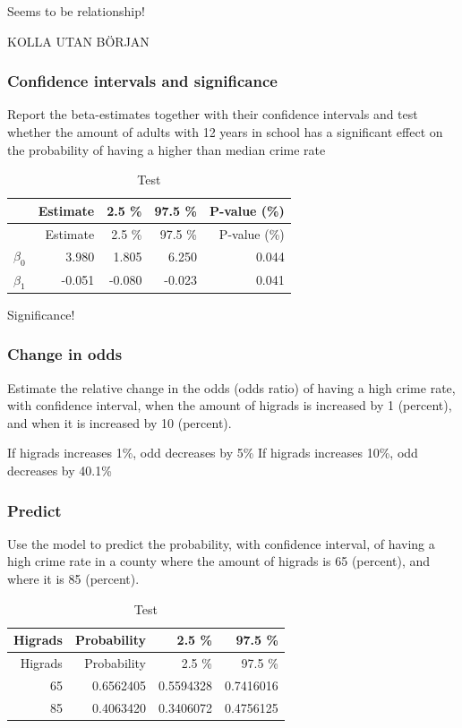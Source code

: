\documentclass[a4paper]{article}
\begin{document}
Seems to be relationship!

KOLLA UTAN BÖRJAN

\subsubsection{Confidence intervals and
significance}\label{confidence-intervals-and-significance}

Report the beta-estimates together with their confidence intervals and
test whether the amount of adults with 12 years in school has a
significant effect on the probability of having a higher than median
crime rate

\begin{longtable}[]{@{}lrrrr@{}}
\caption{Test}\tabularnewline
\toprule
& Estimate & 2.5 \% & 97.5 \% & P-value (\%)\tabularnewline
\midrule
\endfirsthead
\toprule
& Estimate & 2.5 \% & 97.5 \% & P-value (\%)\tabularnewline
\midrule
\endhead
\(\beta_0\) & 3.980 & 1.805 & 6.250 & 0.044\tabularnewline
\(\beta_1\) & -0.051 & -0.080 & -0.023 & 0.041\tabularnewline
\bottomrule
\end{longtable}

Significance!

\subsubsection{Change in odds}\label{change-in-odds}

Estimate the relative change in the odds (odds ratio) of having a high
crime rate, with confidence interval, when the amount of higrads is
increased by 1 (percent), and when it is increased by 10 (percent).

If higrads increases 1\%, odd decreases by 5\% If higrads increases
10\%, odd decreases by 40.1\%

\subsubsection{Predict}\label{predict}

Use the model to predict the probability, with confidence interval, of
having a high crime rate in a county where the amount of higrads is 65
(percent), and where it is 85 (percent).

\begin{longtable}[]{@{}rrrr@{}}
\caption{Test}\tabularnewline
\toprule
Higrads & Probability & 2.5 \% & 97.5 \%\tabularnewline
\midrule
\endfirsthead
\toprule
Higrads & Probability & 2.5 \% & 97.5 \%\tabularnewline
\midrule
\endhead
65 & 0.6562405 & 0.5594328 & 0.7416016\tabularnewline
85 & 0.4063420 & 0.3406072 & 0.4756125\tabularnewline
\bottomrule
\end{longtable}
\end{document}
